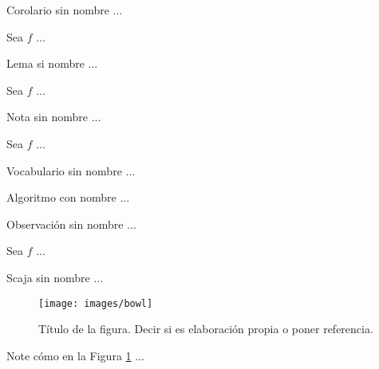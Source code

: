 \documentclass[fleqn]{Paquetes/RevDigMatEduInt}
\begin{document}
\begin{corolario}
Corolario sin nombre ...
\end{corolario}

\begin{lema}
Sea $f$ ...
\end{lema}

\begin{lema}
Lema si nombre ...
\end{lema}

\begin{nota}
Sea $f$ ...
\end{nota}

\begin{nota}
Nota sin nombre ...
\end{nota}

\begin{vocabulario}
Sea $f$ ...
\end{vocabulario}

\begin{vocabulario}
Vocabulario sin nombre ...
\end{vocabulario}

\begin{algoritmo}
	Algoritmo con nombre ...
\end{algoritmo}

\begin{observacion}
	Observación sin nombre ...
\end{observacion}

\begin{caja}
Sea $f$ ...
\end{caja}

\begin{scaja}
Scaja sin nombre ...
\end{scaja}


\begin{figure}[ht!!!]
	\centering
	\begin{minipage}{0.7\textwidth}
		\centering
		\texttt{[image: images/bowl]}
		\caption{Título de la figura. Decir si es elaboración propia o poner referencia.}
		\label{fig:nombre}
	\end{minipage}
\end{figure}

Note cómo en la Figura \ref{fig:nombre} ...
\end{document}
